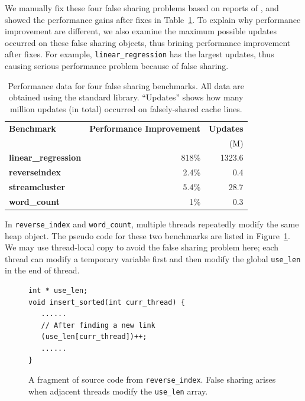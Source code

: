 We manually fix these four false sharing problems based on reports of \SheriffDetect{}, and showed the performance gains after fixes in Table~\ref{table:perfafterfix}. To explain why performance improvement are different, we also examine the maximum possible updates occurred on these false sharing objects, thus brining performance improvement after fixes. For example, \texttt{linear\_regression} has the largest updates, thus causing serious performance problem because of false sharing. 

\begin{table}
\centering
\begin{tabular}{l|r|r}
\hline
{\bf \small Benchmark} & {\bf \small Performance Improvement} & {\bf \small Updates}\\
 & & (M)\\
\hline
\small \textbf{linear\_regression} & 818\% & 1323.6\\
\small \textbf{reverseindex} &  2.4\% & 0.4\\
\small \textbf{streamcluster} & 5.4\% & 28.7\\
\small \textbf{word\_count} &  1\% & 0.3\\
\hline
\end{tabular}
\caption{Performance data for four false sharing benchmarks. All data are obtained using the standard \pthreads{} library. ``Updates'' shows how many million updates (in total) occurred on falsely-shared cache lines.
\label{table:perfafterfix}}
\end{table}


In \texttt{reverse\_index} and \texttt{word\_count}, multiple threads repeatedly modify the same heap object. The pseudo code for these two benchmarks are listed in Figure~\ref{fig:reverseindex}. We may use thread-local copy to avoid the false sharing problem here; each thread can modify a temporary variable first and then modify the global \texttt{use\_len} in the end of thread.

\begin{figure}[!t]
\begin{lstlisting}
int * use_len;
void insert_sorted(int curr_thread) {
   ......	
   // After finding a new link
   (use_len[curr_thread])++;
   ......	
}
\end{lstlisting}
\caption{A fragment of source code from \texttt{reverse\_index}. False sharing arises when adjacent threads 
modify the \texttt{use\_len} array. 
\label{fig:reverseindex}}
\end{figure}

